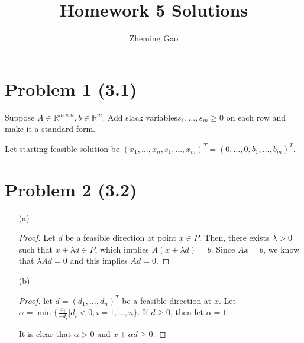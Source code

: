 \documentclass[12pt]{article}
\begin{document}
 
 
\title{Homework 5 Solutions}
\author{Zheming Gao}
\maketitle

\section*{Problem 1 (3.1)}

Suppose $A\in\mathbb R^{m\times n}, b\in\mathbb R^m$. Add slack variables$s_1, \dots, s_m \geqslant 0$ on each row and make it a standard form. 

Let starting feasible solution be $(x_1, \dots, x_n, s_1, \dots, x_m)^T = (0, \dots, 0, b_1, \dots, b_m)^T$.




\section*{Problem 2 (3.2)}
\begin{enumerate}
\item [(a)]

\begin{proof}

Let $d$ be a feasible direction at point $x\in P$. Then, there exists $\lambda> 0$ such that $x + \lambda d \in P$, which implies $A(x + \lambda d) = b$. Since $Ax = b$, we know that $\lambda Ad = 0$ and this implies $Ad = 0$.

\end{proof}


\item [(b)]

\begin{proof}

let $d = (d_1, \dots, d_n)^T$ be a feasible direction at $x$. Let $\alpha = \min\{\frac{x_i}{-d_i} | d_i < 0, i = 1, \dots, n \}$. If $d \geqslant 0$, then let $\alpha = 1$.

It is clear that $\alpha > 0$ and $x + \alpha d \geqslant 0$.

\end{proof}

\end{enumerate}
\end{document}
